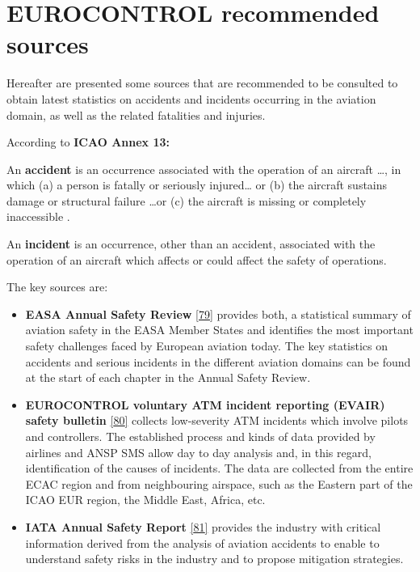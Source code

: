 \documentclass[
  11pt,
  a4paper,
]{book}
\begin{document}
\hypertarget{eurocontrol-recommended-sources-4}{%
\section{EUROCONTROL recommended
sources}\label{eurocontrol-recommended-sources-4}}

Hereafter are presented some sources that are recommended to be
consulted to obtain latest statistics on accidents and incidents
occurring in the aviation domain, as well as the related fatalities and
injuries.

According to \textbf{ICAO Annex 13:}

An \textbf{accident} is an occurrence associated with the operation of
an aircraft \ldots, in which (a) a person is fatally or seriously
injured\ldots{} or (b) the aircraft sustains damage or structural
failure \ldots or (c) the aircraft is missing or completely inaccessible
.

An \textbf{incident} is an occurrence, other than an accident,
associated with the operation of an aircraft which affects or could
affect the safety of operations.

The key sources are:

\begin{itemize}
\item
  \textbf{EASA Annual Safety Review}
  \protect\hyperlink{ref-AnnualSafetyReview}{{[}79{]}} provides both, a
  statistical summary of aviation safety in the EASA Member States and
  identifies the most important safety challenges faced by European
  aviation today. The key statistics on accidents and serious incidents
  in the different aviation domains can be found at the start of each
  chapter in the Annual Safety Review.
\item
  \textbf{EUROCONTROL voluntary ATM incident reporting (EVAIR) safety
  bulletin} \protect\hyperlink{ref-atmincidentreport}{{[}80{]}} collects
  low-severity ATM incidents which involve pilots and controllers. The
  established process and kinds of data provided by airlines and ANSP
  SMS allow day to day analysis and, in this regard, identification of
  the causes of incidents. The data are collected from the entire ECAC
  region and from neighbouring airspace, such as the Eastern part of the
  ICAO EUR region, the Middle East, Africa, etc.
\item
  \textbf{IATA Annual Safety Report}
  \protect\hyperlink{ref-iata:safety:report}{{[}81{]}} provides the
  industry with critical information derived from the analysis of
  aviation accidents to enable to understand safety risks in the
  industry and to propose mitigation strategies.
\end{itemize}
\end{document}
